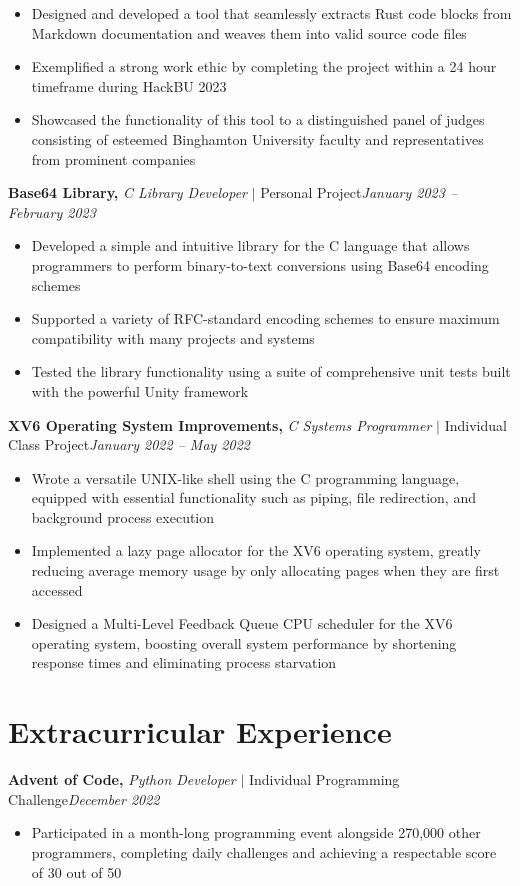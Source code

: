 \documentclass[8pt]{extarticle}
\newcommand{\jobentry}[4]{\textbf{#1,} \textit{#2} \(|\) #3\hfill \textit{#4}}
\begin{document}
\begin{itemize}
  \item{Designed and developed a tool that seamlessly extracts Rust code blocks from Markdown documentation and weaves them into valid source code files}
  \item{Exemplified a strong work ethic by completing the project within a 24 hour timeframe during HackBU 2023}
  \item{Showcased the functionality of this tool to a distinguished panel of judges consisting of esteemed Binghamton University faculty and representatives from prominent companies}
\end{itemize}

\jobentry{Base64 Library}{C Library Developer}{Personal Project}{January 2023 -- February 2023}

\begin{itemize}
  \item{Developed a simple and intuitive library for the C language that allows programmers to perform binary-to-text conversions using Base64 encoding schemes}
  \item{Supported a variety of RFC-standard encoding schemes to ensure maximum compatibility with many projects and systems}
  \item{Tested the library functionality using a suite of comprehensive unit tests built with the powerful Unity framework}
\end{itemize}

\jobentry{XV6 Operating System Improvements}{C Systems Programmer}{Individual Class Project}{January 2022 -- May 2022}

\begin{itemize}
  \item{Wrote a versatile UNIX-like shell using the C programming language, equipped with essential functionality such as piping, file redirection, and background process execution}
  \item{Implemented a lazy page allocator for the XV6 operating system, greatly reducing average memory usage by only allocating pages when they are first accessed}
  \item{Designed a Multi-Level Feedback Queue CPU scheduler for the XV6 operating system, boosting overall system performance by shortening response times and eliminating process starvation}
\end{itemize}

\section{Extracurricular Experience}

\jobentry{Advent of Code}{Python Developer}{Individual Programming Challenge}{December 2022}
\begin{itemize}
  \item{Participated in a month-long programming event alongside 270,000 other programmers, completing daily challenges and achieving a respectable score of 30 out of 50}
\end{itemize}
\end{document}
